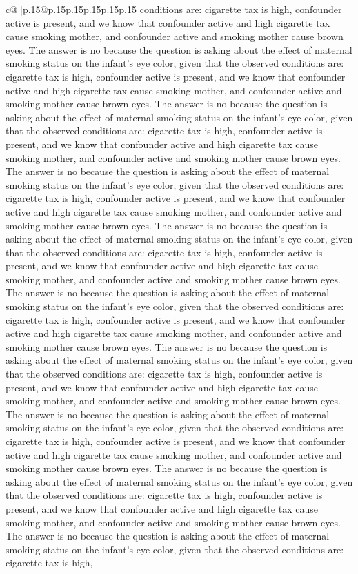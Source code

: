 \documentclass{article}
\begin{document}
{\begin{supertabular}{c@{$\;$}|p{.15\linewidth}@{}p{.15\linewidth}p{.15\linewidth}p{.15\linewidth}p{.15\linewidth}p{.15\linewidth}}
{{{conditions are: cigarette tax is high, confounder active is present, and we know that confounder active and high cigarette tax cause smoking mother, and confounder active and smoking mother cause brown eyes. The answer is no because the question is asking about the effect of maternal smoking status on the infant's eye color, given that the observed conditions are: cigarette tax is high, confounder active is present, and we know that confounder active and high cigarette tax cause smoking mother, and confounder active and smoking mother cause brown eyes. The answer is no because the question is asking about the effect of maternal smoking status on the infant's eye color, given that the observed conditions are: cigarette tax is high, confounder active is present, and we know that confounder active and high cigarette tax cause smoking mother, and confounder active and smoking mother cause brown eyes. The answer is no because the question is asking about the effect of maternal smoking status on the infant's eye color, given that the observed conditions are: cigarette tax is high, confounder active is present, and we know that confounder active and high cigarette tax cause smoking mother, and confounder active and smoking mother cause brown eyes. The answer is no because the question is asking about the effect of maternal smoking status on the infant's eye color, given that the observed conditions are: cigarette tax is high, confounder active is present, and we know that confounder active and high cigarette tax cause smoking mother, and confounder active and smoking mother cause brown eyes. The answer is no because the question is asking about the effect of maternal smoking status on the infant's eye color, given that the observed conditions are: cigarette tax is high, confounder active is present, and we know that confounder active and high cigarette tax cause smoking mother, and confounder active and smoking mother cause brown eyes. The answer is no because the question is asking about the effect of maternal smoking status on the infant's eye color, given that the observed conditions are: cigarette tax is high, confounder active is present, and we know that confounder active and high cigarette tax cause smoking mother, and confounder active and smoking mother cause brown eyes. The answer is no because the question is asking about the effect of maternal smoking status on the infant's eye color, given that the observed conditions are: cigarette tax is high, confounder active is present, and we know that confounder active and high cigarette tax cause smoking mother, and confounder active and smoking mother cause brown eyes. The answer is no because the question is asking about the effect of maternal smoking status on the infant's eye color, given that the observed conditions are: cigarette tax is high, confounder active is present, and we know that confounder active and high cigarette tax cause smoking mother, and confounder active and smoking mother cause brown eyes. The answer is no because the question is asking about the effect of maternal smoking status on the infant's eye color, given that the observed conditions are: cigarette tax is high, }}}
\end{supertabular}}
\end{document}
